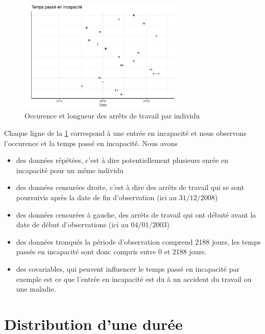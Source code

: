 \begin{figure}[h!]
\centering
\includegraphics[width = 0.7\textwidth]{../figures/INC_visu}
\caption{Occurence et longueur des arrêts de travail par individu}
\label{fig:INC_visu}
\end{figure}
Chaque ligne de la \cref{fig:INC_visu} correspond à une entrée en incapacité et nous observons l'occurence et la temps passé en incapacité. Nous avons
\begin{itemize}
\item des données répétées, c'est à dire potentiellement plusieurs enrée en incapacité pour un même individu
\item des données censurées droite, c'est à dire des arrêts de travail qui se sont poursuivis après la date de fin d'observation (ici au $31/12/2008$)
\item des données censurées à gauche, des arrêts de travail qui ont débuté avant la date de début d'observations (ici au $04/01/2003$)
\item des données tronqués la période d'observation comprend 2188 jours, les temps passés en incapacité sont donc compris entre 0 et 2188 jours.
\item des covariables, qui peuvent influencer le temps passé en incapacité par exemple est ce que l'entrée en incapacité est du à un accident du travail ou une maladie.
\end{itemize}
\section{Distribution d'une durée}

